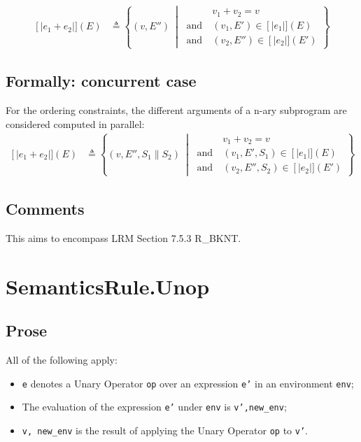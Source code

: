 \documentclass{book}
\newcommand\llbracket{[|}
\newcommand\rrbracket{|]}
\newcommand\interp[1]{\left\llbracket #1 \right\rrbracket}
\newcommand\st[0]{\ \middle|\ }
\begin{document}
  \begin{align}
  \interp{e_1 + e_2} (E) & \triangleq
    \left\{ (v, E'') \st{}
    \begin{aligned}
      & v_1 + v_2 = v
      \\ \text{and}\ &
      (v_1, E') \in{} \interp{e_1} (E)
      \\ \text{and}\ &
      (v_2, E'') \in{} \interp{e_2} (E')
    \end{aligned}
    \right\}
  \label{eq:sem-seq-plus}
  \end{align} 

  \subsection{Formally: concurrent case}
  For the ordering constraints, the different arguments of a n-ary subprogram
are considered computed in parallel:
  \begin{align}
    \interp{e_1 + e_2} (E) & \triangleq
    \left\{ (v, E'', S_1 \parallel S_2) \st{}
    \begin{aligned}
      & v_1 + v_2 = v
      \\ \text{and}\ &
      (v_1, E', S_1) \in{} \interp{e_1} (E)
      \\ \text{and}\ &
      (v_2, E'', S_2) \in{} \interp{e_2} (E')
    \end{aligned}
    \right\}
  \label{eq:sem-conc-plus}
  \end{align} 

  \subsection{Comments}
  This aims to encompass LRM Section 7.5.3 R\_BKNT.

\section{SemanticsRule.Unop \label{sec:SemanticsRule.Unop}}

  \subsection{Prose}
  All of the following apply:
  \begin{itemize}
  \item \texttt{e} denotes a Unary Operator \texttt{op} over an expression \texttt{e'} in an environment \texttt{env};
  \item The evaluation of the expression \texttt{e'} under \texttt{env} is \texttt{v',new\_env};
  \item \texttt{v, new\_env} is the result of applying the Unary Operator \texttt{op} to \texttt{v'}.
  \end{itemize}
\end{document}
